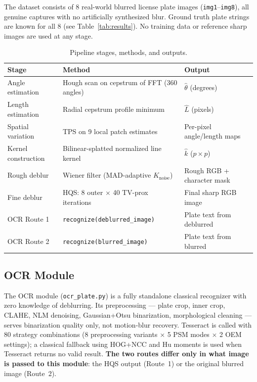 \documentclass[12pt,a4paper]{article}
\begin{document}
The dataset consists of 8 real-world blurred license plate images (\texttt{img1}--\texttt{img8}),
all genuine captures with no artificially synthesized blur. Ground truth plate strings are
known for all 8 (see Table~\ref{tab:results}). No training data or reference sharp images
are used at any stage.

\begin{table}[H]
  \centering
  \caption{Pipeline stages, methods, and outputs.}
  \label{tab:pipeline}
  \small
  \begin{tabular}{@{}lll@{}}
    \toprule
    \textbf{Stage} & \textbf{Method} & \textbf{Output} \\
    \midrule
    Angle estimation    & Hough scan on cepstrum of FFT (360 angles)       & $\hat{\theta}$ (degrees) \\
    Length estimation   & Radial cepstrum profile minimum                  & $\hat{L}$ (pixels) \\
    Spatial variation   & TPS on 9 local patch estimates                   & Per-pixel angle/length maps \\
    Kernel construction & Bilinear-splatted normalized line kernel          & $\hat{k}$ ($p{\times}p$) \\
    Rough deblur        & Wiener filter (MAD-adaptive $K_{\mathrm{noise}}$) & Rough RGB + character mask \\
    Fine deblur         & HQS: 8 outer $\times$ 40 TV-prox iterations      & Final sharp RGB image \\
    OCR Route 1         & \texttt{recognize(deblurred\_image)}             & Plate text from deblurred \\
    OCR Route 2         & \texttt{recognize(blurred\_image)}               & Plate text from blurred \\
    \bottomrule
  \end{tabular}
\end{table}

\subsection{OCR Module}

The OCR module (\texttt{ocr\_plate.py}) is a fully standalone classical recognizer with
zero knowledge of deblurring. Its preprocessing --- plate crop, inner crop, CLAHE,
NLM denoising, Gaussian+Otsu binarization, morphological cleaning --- serves binarization
quality only, not motion-blur recovery. Tesseract is called with 80 strategy combinations
(8 preprocessing variants $\times$ 5 PSM modes $\times$ 2 OEM settings); a classical
fallback using HOG+NCC and Hu moments is used when Tesseract returns no valid result.
\textbf{The two routes differ only in what image is passed to this module}: the HQS
output (Route~1) or the original blurred image (Route~2).
\end{document}
